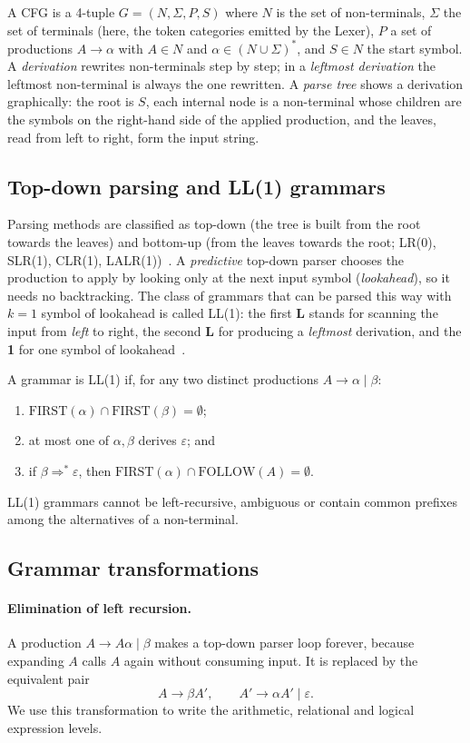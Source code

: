 \documentclass[11pt,a4paper]{article}
\newcommand{\eps}{\varepsilon}
\begin{document}
A CFG is a 4-tuple $G=(N,\Sigma,P,S)$ where $N$ is the set of non-terminals, $\Sigma$ the set of terminals (here, the token categories emitted by the Lexer), $P$ a set of productions $A\to\alpha$ with $A\in N$ and $\alpha\in(N\cup\Sigma)^{*}$, and $S\in N$ the start symbol. A \emph{derivation} rewrites non-terminals step by step; in a \emph{leftmost derivation} the leftmost non-terminal is always the one rewritten. A \emph{parse tree} shows a derivation graphically: the root is $S$, each internal node is a non-terminal whose children are the symbols on the right-hand side of the applied production, and the leaves, read from left to right, form the input string.

\subsection{Top-down parsing and LL(1) grammars}
Parsing methods are classified as top-down (the tree is built from the root towards the leaves) and bottom-up (from the leaves towards the root; LR(0), SLR(1), CLR(1), LALR(1))~\cite{aho,cooper}. A \emph{predictive} top-down parser chooses the production to apply by looking only at the next input symbol (\emph{lookahead}), so it needs no backtracking. The class of grammars that can be parsed this way with $k=1$ symbol of lookahead is called LL(1): the first \textbf{L} stands for scanning the input from \emph{left} to right, the second \textbf{L} for producing a \emph{leftmost} derivation, and the \textbf{1} for one symbol of lookahead~\cite{lewis-stearns,knuth-topdown,rosenkrantz}.

A grammar is LL(1) if, for any two distinct productions $A\to\alpha\mid\beta$:
\begin{enumerate}[noitemsep]
  \item $\mathrm{FIRST}(\alpha)\cap\mathrm{FIRST}(\beta)=\emptyset$;
  \item at most one of $\alpha,\beta$ derives $\eps$; and
  \item if $\beta\Rightarrow^{*}\eps$, then $\mathrm{FIRST}(\alpha)\cap\mathrm{FOLLOW}(A)=\emptyset$.
\end{enumerate}
LL(1) grammars cannot be left-recursive, ambiguous or contain common prefixes among the alternatives of a non-terminal.

\subsection{Grammar transformations}
\paragraph{Elimination of left recursion.} A production $A\to A\alpha\mid\beta$ makes a top-down parser loop forever, because expanding $A$ calls $A$ again without consuming input. It is replaced by the equivalent pair
\[
A\to\beta A',\qquad A'\to\alpha A'\mid\eps .
\]
We use this transformation to write the arithmetic, relational and logical expression levels.
\end{document}
